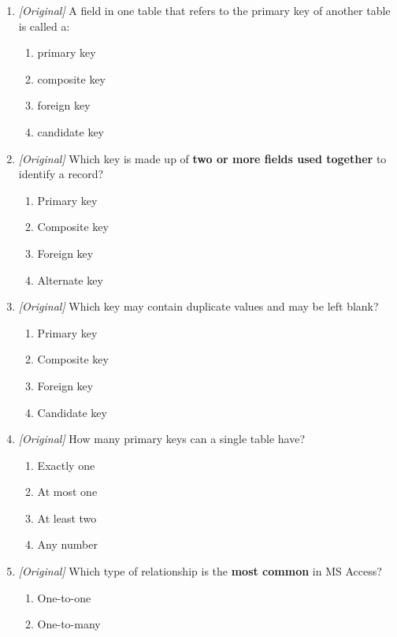 \begin{enumerate}[label=\textbf{Q\arabic*.}, leftmargin=*]
\begin{enumerate}[label=\Alph*.]
    \item It may contain duplicate values.
    \item A table has at most one of it.
  \end{enumerate}
\item \textit{[Original]} A field in one table that refers to the primary key
  of another table is called a:
  \begin{enumerate}[label=\Alph*.]
    \item primary key
    \item composite key
    \item foreign key
    \item candidate key
  \end{enumerate}
\item \textit{[Original]} Which key is made up of \textbf{two or more fields
  used together} to identify a record?
  \begin{enumerate}[label=\Alph*.]
    \item Primary key
    \item Composite key
    \item Foreign key
    \item Alternate key
  \end{enumerate}
\item \textit{[Original]} Which key may contain duplicate values and may be
  left blank?
  \begin{enumerate}[label=\Alph*.]
    \item Primary key
    \item Composite key
    \item Foreign key
    \item Candidate key
  \end{enumerate}
\item \textit{[Original]} How many primary keys can a single table have?
  \begin{enumerate}[label=\Alph*.]
    \item Exactly one
    \item At most one
    \item At least two
    \item Any number
  \end{enumerate}
\item \textit{[Original]} Which type of relationship is the \textbf{most
  common} in MS Access?
  \begin{enumerate}[label=\Alph*.]
    \item One-to-one
    \item One-to-many

\end{enumerate}
\end{enumerate}

